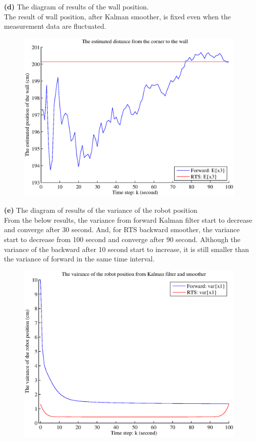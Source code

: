 \documentclass{article}
\begin{document}
\noindent \textbf{(d)} The diagram of results of the wall position.\\
The result of wall position, after Kalman smoother, is fixed even when the measurement data are fluctuated.

\begin{figure}[H]
\begin{center}
\includegraphics[scale=0.6]{hw7_x3.eps}
\end{center}
\end{figure}

\noindent \textbf{(e)} The diagram of results of the variance of the robot position\\
From the below results, the variance from forward Kalman filter start to decrease and converge after 30 second.
And, for RTS backward smoother, the variance start to decrease from 100 second and converge after 90 second.
Although the variance of the backward after 10 second start to increase, it is still smaller than the variance of forward 
in the same time interval.

\begin{figure}[H]
\begin{center}
\includegraphics[scale=0.6]{hw7_varx13.eps}
\end{center}
\end{figure}
\end{document}
